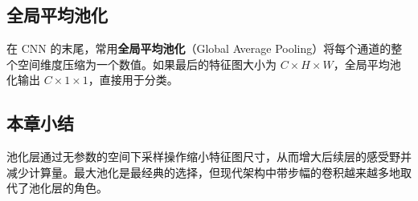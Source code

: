\subsection{全局平均池化}

在 CNN 的末尾，常用\textbf{全局平均池化}（Global Average Pooling）将每个通道的整个空间维度压缩为一个数值。如果最后的特征图大小为 $C \times H \times W$，全局平均池化输出 $C \times 1 \times 1$，直接用于分类。

\subsection{本章小结}

池化层通过无参数的空间下采样操作缩小特征图尺寸，从而增大后续层的感受野并减少计算量。最大池化是最经典的选择，但现代架构中带步幅的卷积越来越多地取代了池化层的角色。


